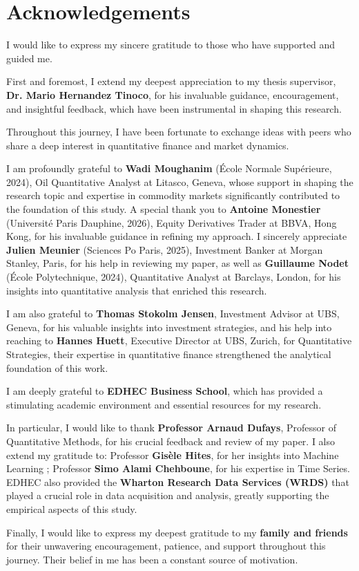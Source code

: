\chapter*{Acknowledgements} %
I would like to express my sincere gratitude to those who have supported and guided me.

First and foremost, I extend my deepest appreciation to my thesis supervisor, \textbf{Dr. Mario Hernandez Tinoco}, for his invaluable guidance, encouragement, and insightful feedback, which have been instrumental in shaping this research.

Throughout this journey, I have been fortunate to exchange ideas with peers who share a deep interest in quantitative finance and market dynamics.

I am profoundly grateful to \textbf{Wadi Moughanim} (École Normale Supérieure, 2024), Oil Quantitative Analyst at Litasco, Geneva, whose support in shaping the research topic and expertise in commodity markets significantly contributed to the foundation of this study. A special thank you to \textbf{Antoine Monestier} (Université Paris Dauphine, 2026), Equity Derivatives Trader at BBVA, Hong Kong, for his invaluable guidance in refining my approach. I sincerely appreciate \textbf{Julien Meunier} (Sciences Po Paris, 2025), Investment Banker at Morgan Stanley, Paris, for his help in reviewing my paper, as well as \textbf{Guillaume Nodet} (École Polytechnique, 2024), Quantitative Analyst at Barclays, London, for his insights into quantitative analysis that enriched this research.

I am also grateful to \textbf{Thomas Stokolm Jensen}, Investment Advisor at UBS, Geneva, for his valuable insights into investment strategies, and his help into reaching to \textbf{Hannes Huett}, Executive Director at UBS, Zurich, for Quantitative Strategies, their expertise in quantitative finance strengthened the analytical foundation of this work.

I am deeply grateful to \textbf{EDHEC Business School}, which has provided a stimulating academic environment and essential resources for my research.

In particular, I would like to thank \textbf{Professor Arnaud Dufays}, Professor of Quantitative Methods, for his crucial feedback and review of my paper. I also extend my gratitude to: Professor \textbf{Gisèle Hites}, for her insights into Machine Learning ; Professor \textbf{Simo Alami Chehboune}, for his expertise in Time Series. EDHEC also provided the \textbf{Wharton Research Data Services (WRDS)} that played a crucial role in data acquisition and analysis, greatly supporting the empirical aspects of this study.

Finally, I would like to express my deepest gratitude to my \textbf{family and friends} for their unwavering encouragement, patience, and support throughout this journey. Their belief in me has been a constant source of motivation.